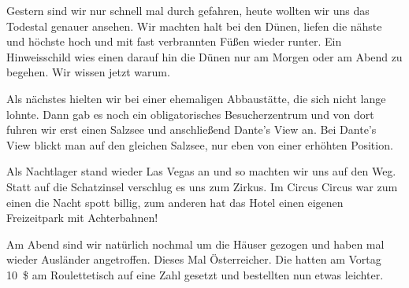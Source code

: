 Gestern sind wir nur schnell mal durch gefahren, heute wollten wir uns das Todestal genauer ansehen.
Wir machten halt bei den Dünen, liefen die nähste und höchste hoch und mit fast verbrannten Füßen wieder runter.
Ein Hinweisschild wies einen darauf hin die Dünen nur am Morgen oder am Abend zu begehen.
Wir wissen jetzt warum.

Als nächstes hielten wir bei einer ehemaligen Abbaustätte, die sich nicht lange lohnte.
Dann gab es noch ein obligatorisches Besucherzentrum und von dort fuhren wir erst einen Salzsee und anschließend Dante's View an.
Bei Dante's View blickt man auf den gleichen Salzsee, nur eben von einer erhöhten Position.

Als Nachtlager stand wieder Las Vegas an und so machten wir uns auf den Weg.
Statt auf die Schatzinsel verschlug es uns zum Zirkus.
Im Circus Circus war zum einen die Nacht spott billig, zum anderen hat das Hotel einen eigenen Freizeitpark mit Achterbahnen!

Am Abend sind wir natürlich nochmal um die Häuser gezogen und haben mal wieder Ausländer angetroffen.
Dieses Mal Österreicher.
Die hatten am Vortag 10~\$ am Roulettetisch auf eine Zahl gesetzt und bestellten nun etwas leichter.
